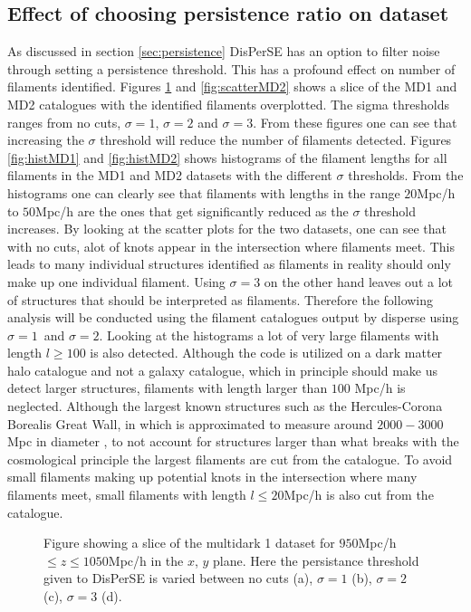 \subsection{Effect of choosing persistence ratio on dataset}
As discussed in section \ref{sec:persistence} DisPerSE has an option to filter
noise through setting a persistence threshold. This has a profound effect on number of filaments identified. Figures \ref{fig:scatterMD1} and \ref{fig:scatterMD2} shows a slice of the MD1 and MD2 catalogues with the identified filaments overplotted. The sigma thresholds ranges from no cuts, $\sigma=1$, $\sigma=2$ and $\sigma=3$. From these figures one can see that increasing the $\sigma$ threshold will reduce the number of filaments detected. Figures \ref{fig:histMD1} and \ref{fig:histMD2} shows histograms of the filament lengths for all filaments in the MD1 and MD2 datasets with the different $\sigma$ thresholds. From the histograms one can clearly see that filaments with lengths in the range $20$Mpc/h to $50$Mpc/h are the ones that get significantly reduced as the $\sigma$ threshold increases. By looking at the scatter plots for the two datasets, one can see that with no cuts, alot of knots appear in the intersection where filaments meet. This leads to many individual structures identified as filaments in reality should only make up one individual filament. Using $\sigma=3$ on the other hand leaves out a lot of structures that should be interpreted as filaments. Therefore the following analysis will be conducted using the filament catalogues output by disperse using $\sigma=1$ and $\sigma=2$. Looking at the histograms a lot of very large filaments with length $l\geq 100$ is also detected. Although the code is utilized on a dark matter halo catalogue and not a galaxy catalogue, which in principle should make us detect larger structures, filaments with length larger than $100$ Mpc/h is neglected. Although the largest known structures such as the Hercules-Corona Borealis Great Wall, in which is approximated to measure around $2000-3000$Mpc in diameter \cite{herculescorona}, to not account for structures larger than what breaks with the cosmological principle the largest filaments are cut from the catalogue. To avoid small filaments making up potential knots in the intersection where many filaments meet, small filaments with length $l\leq 20$Mpc/h is also cut from the catalogue.
\begin{figure}[H]
    \hspace{1em}%
    \hspace{1em}%
    \caption{Figure showing a slice of the multidark 1 dataset for $950$Mpc/h$\leq z\leq1050$Mpc/h in the $x$, $y$ plane. Here the persistance threshold given to DisPerSE is varied between no cuts (a), $\sigma=1$ (b), $\sigma=2$ (c), $\sigma=3$ (d).}
    \label{fig:scatterMD1}
\end{figure}
